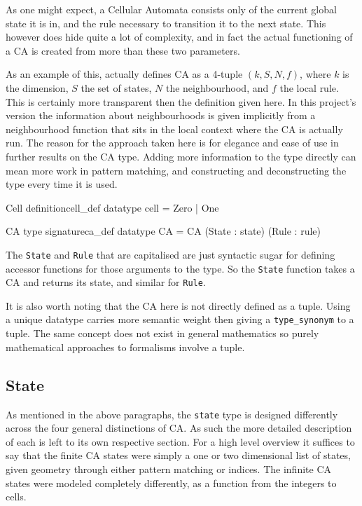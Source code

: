 As one might expect,
a Cellular Automata consists only of the current global state it is in,
and the rule necessary to transition it to the next state.
This however does hide quite a lot of complexity,
and in fact the actual functioning of a CA is created from more than these two parameters.

As an example of this,
\cite{yu} actually defines CA as a 4-tuple $(k, S, N, f)$,
where $k$ is the dimension,
$S$ the set of states,
$N$ the neighbourhood,
and $f$ the local rule.
This is certainly more transparent then the definition given here.
In this project's version the information about neighbourhoods is given implicitly from a neighbourhood function that sits in the local context where the CA is actually run.
The reason for the approach taken here is for elegance and ease of use in further results on the CA type.
Adding more information to the type directly can mean more work in pattern matching,
and constructing and deconstructing the type every time it is used.

\begin{myminted}{Cell definition}{cell_def}
    datatype cell = Zero | One
\end{myminted}

\begin{myminted}{CA type signature}{ca_def}
    datatype CA = CA (State : state) (Rule : rule)
\end{myminted}

The \texttt{State} and \texttt{Rule} that are capitalised are just syntactic sugar for defining accessor functions for those arguments to the type.
So the \texttt{State} function takes a CA and returns its state, 
and similar for \texttt{Rule}.

It is also worth noting that the CA here is not directly defined as a tuple.
Using a unique datatype carries more semantic weight then giving a \texttt{type_synonym} to a tuple.
The same concept does not exist in general mathematics so purely mathematical approaches to formalisms involve a tuple.

\subsection{State}

As mentioned in the above paragraphs,
the \texttt{state} type is designed differently across the four general distinctions of CA.
As such the more detailed description of each is left to its own respective section.
For a high level overview it suffices to say that the finite CA states were simply a one or two dimensional list of states,
given geometry through either pattern matching or indices.
The infinite CA states were modeled completely differently,
as a function from the integers to cells.

